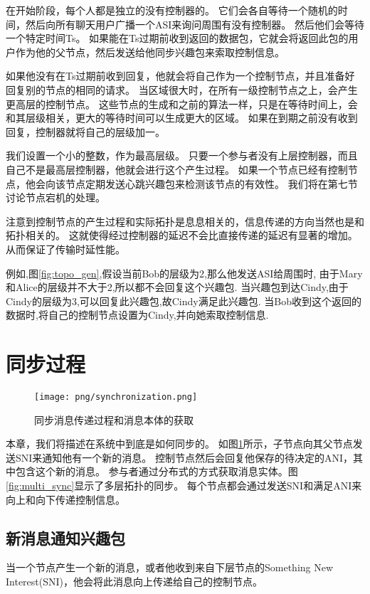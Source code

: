 在开始阶段，每个人都是独立的没有控制器的。
它们会各自等待一个随机的时间，然后向所有聊天用户广播一个ASI来询问周围有没有控制器。
然后他们会等待一个特定时间Ts。
如果能在Ts过期前收到返回的数据包，它就会将返回此包的用户作为他的父节点，然后发送给他同步兴趣包来索取控制信息。

如果他没有在Ts过期前收到回复，他就会将自己作为一个控制节点，并且准备好回复别的节点的相同的请求。
当区域很大时，在所有一级控制节点之上，会产生更高层的控制节点。
这些节点的生成和之前的算法一样，只是在等待时间上，会和其层级相关，更大的等待时间可以生成更大的区域。
如果在到期之前没有收到回复，控制器就将自己的层级加一。

我们设置一个小的整数，作为最高层级。
只要一个参与者没有上层控制器，而且自己不是最高层控制器，他就会进行这个产生过程。
如果一个节点已经有控制节点，他会向该节点定期发送心跳兴趣包来检测该节点的有效性。
我们将在第七节讨论节点宕机的处理。

注意到控制节点的产生过程和实际拓扑是息息相关的，信息传递的方向当然也是和拓扑相关的。
这就使得经过控制器的延迟不会比直接传递的延迟有显著的增加。
从而保证了传输时延性能。

例如,图\ref{fig:topo_gen},假设当前Bob的层级为2,那么他发送ASI给周围时,
由于Mary和Alice的层级并不大于2,所以都不会回复这个兴趣包.
当兴趣包到达Cindy,由于Cindy的层级为3,可以回复此兴趣包,故Cindy满足此兴趣包.
当Bob收到这个返回的数据时,将自己的控制节点设置为Cindy,并向她索取控制信息.



\section{同步过程}

\begin{figure}
\centering
\texttt{[image: png/synchronization.png]}
\caption{同步消息传递过程和消息本体的获取}
\label{fig:sync_process}
\end{figure}


本章，我们将描述在系统中到底是如何同步的。
如图\ref{fig:sync_process}所示，子节点向其父节点发送SNI来通知他有一个新的消息。
控制节点然后会回复他保存的待决定的ANI，其中包含这个新的消息。
参与者通过分布式的方式获取消息实体。图\ref{fig:multi_sync}显示了多层拓扑的同步。
每个节点都会通过发送SNI和满足ANI来向上和向下传递控制信息。

\subsection{新消息通知兴趣包}
当一个节点产生一个新的消息，或者他收到来自下层节点的Something New Interest(SNI)，他会将此消息向上传递给自己的控制节点。

